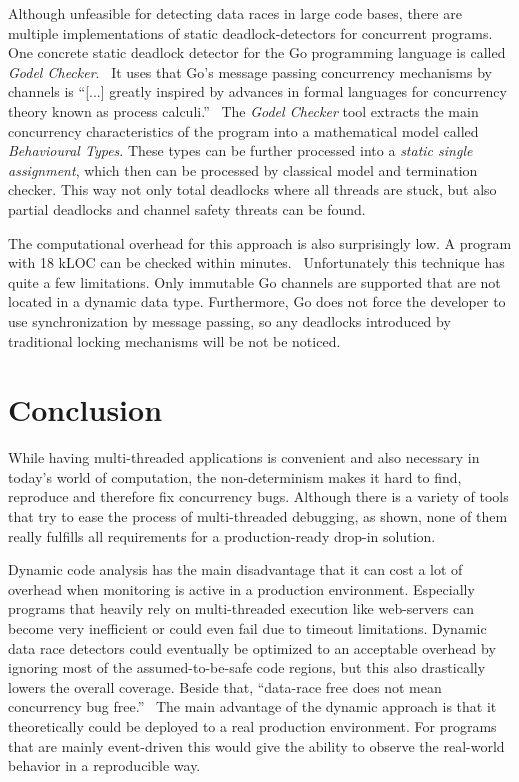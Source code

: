 \documentclass[conference]{IEEEtran}
\begin{document}
Although unfeasible for detecting data races in large code bases, there are multiple implementations of static deadlock-detectors for concurrent programs.
One concrete static deadlock detector for the Go programming language is called \emph{Godel Checker}.~\cite{godelChecker}
It uses that Go's message passing concurrency mechanisms by channels is ``[...] greatly inspired by advances in formal languages for concurrency theory known as process calculi.''~\cite{lange2018verification}
The \emph{Godel Checker} tool extracts the main concurrency characteristics of the program into a mathematical model called \emph{Behavioural Types}.
These types can be further processed into a \emph{static single assignment}, which then can be processed by classical model and termination checker.
This way not only total deadlocks where all threads are stuck, but also partial deadlocks and channel safety threats can be found.

The computational overhead for this approach is also surprisingly low.
A program with 18 kLOC can be checked within minutes.~\cite{lange2018verification}
Unfortunately this technique has quite a few limitations.
Only immutable Go channels are supported that are not located in a dynamic data type.
Furthermore, Go does not force the developer to use synchronization by message passing, so any deadlocks introduced by traditional locking mechanisms will be not be noticed.


\section{Conclusion}
\label{sct:conclusion}

While having multi-threaded applications is convenient and also necessary in today's world of computation, the non-determinism makes it hard to find, reproduce and therefore fix concurrency bugs.
Although there is a variety of tools that try to ease the process of multi-threaded debugging, as shown, none of them really fulfills all requirements for a production-ready drop-in solution.

Dynamic code analysis has the main disadvantage that it can cost a lot of overhead when monitoring is active in a production environment.
Especially programs that heavily rely on multi-threaded execution like web-servers  can become very inefficient or could even fail due to timeout limitations.
Dynamic data race detectors could eventually be optimized to an acceptable overhead by ignoring most of the assumed-to-be-safe code regions, but this also drastically lowers the overall coverage.
Beside that, ``data-race free does not mean concurrency bug free.''~\cite{lu2008mistakes}
The main advantage of the dynamic approach is that it theoretically could be deployed to a real production environment.
For programs that are mainly event-driven this would give the ability to observe the real-world behavior in a reproducible way.
\end{document}
